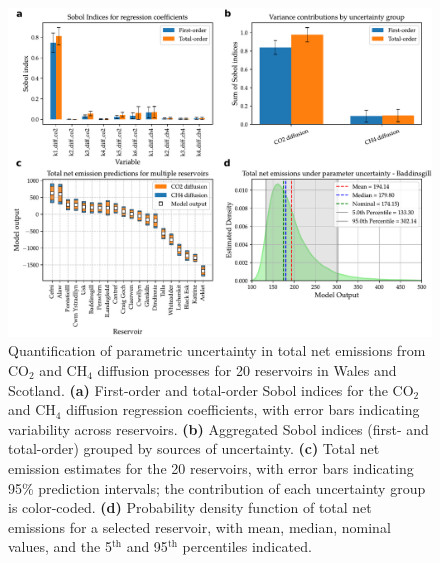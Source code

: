 \documentclass[final,1p,times]{elsarticle}
\begin{document}
\begin{figure}[!h]
    \centering
    \includegraphics[width=1.0\textwidth]{figures/reemission_sobol_paper.pdf}
    \caption{
Quantification of parametric uncertainty in total net emissions from CO$_2$ and CH$_4$ diffusion processes for 20 reservoirs in Wales and Scotland. 
\textbf{(a)} First-order and total-order Sobol indices for the CO$_2$ and CH$_4$ diffusion regression coefficients, with error bars indicating variability across reservoirs. 
\textbf{(b)} Aggregated Sobol indices (first- and total-order) grouped by sources of uncertainty. 
\textbf{(c)} Total net emission estimates for the 20 reservoirs, with error bars indicating 95\% prediction intervals; the contribution of each uncertainty group is color-coded. 
\textbf{(d)} Probability density function of total net emissions for a selected reservoir, with mean, median, nominal values, and the 5$^\textrm{th}$ and 95$^\textrm{th}$ percentiles indicated.
}
    \label{fig:uncertainty_analysis}
\end{figure}
\end{document}
